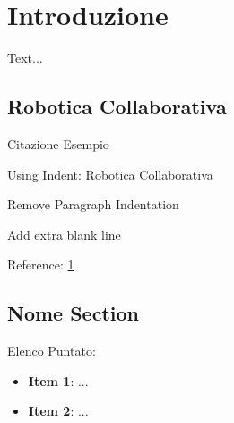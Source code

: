 
\chapter{Introduzione}\label{chapter:Introduzione}

    Text...

	\newpage
	
	
	    
\section{Robotica Collaborativa}\label{section:Robotica_Collaborativa}

	Citazione Esempio \textsuperscript{ \cite{Example}} 
	
	Using Indent: Robotica Collaborativa \textsuperscript{\cite{Robotica_Collaborativa_Storia}}
	
	\noindent
	Remove Paragraph Indentation
	
	\noindent
	Add extra blank line \vspace{\baselineskip}
	
	\noindent
	Reference: \ref{chapter:Introduzione}
	
	\newpage
	


\section{Nome Section}\label{section:nome}

	\noindent
	Elenco Puntato:
	
	\begin{itemize}
		
		\item \textbf{Item 1}: ...
		
		\item \textbf{Item 2}: ...
		
	\end{itemize}
	